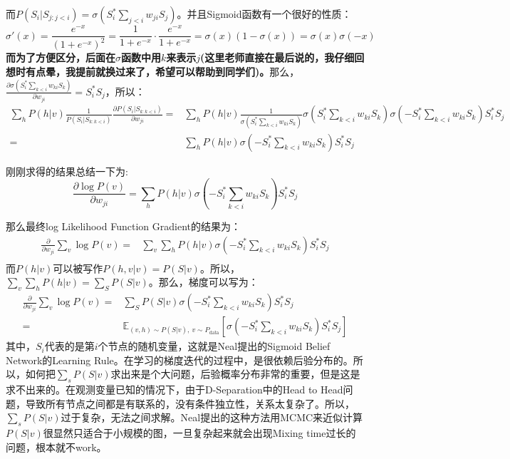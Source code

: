 \documentclass[a4paper]{article}
\begin{document}
而$P(S_i|S_{j:j<i}) = \sigma\left(S^\ast_i\sum_{j<i}w_{ji}S_j \right) $。并且Sigmoid函数有一个很好的性质：
\begin{equation}
    \sigma'(x) = \frac{e^{-x}}{(1+e^{-x})^2} = \frac{1}{1+e^{-x}} \cdot \frac{e^{-x}}{1+e^{-x}} = \sigma(x)(1-\sigma(x)) = \sigma(x) \sigma(-x)
\end{equation}
\textbf{而为了方便区分，后面在$\sigma$函数中用$k$来表示$j$(这里老师直接在最后说的，我仔细回想时有点晕，我提前就换过来了，希望可以帮助到同学们)。}那么，$\frac{\partial \sigma\left(S^\ast_i\sum_{k<i}w_{ki}S_k\right)}{\partial w_{ji}} = S^\ast_i S_j $，所以：
\begin{equation}
    \begin{split}
        \sum_h P(h|v) \frac{1}{P(S_i|S_{k:k<i})}\frac{ \partial P(S_i|S_{k:k<i})}{\partial w_{ji}} = & \sum_h P(h|v) \frac{1}{\sigma\left(S^\ast_i\sum_{k<i}w_{ki}S_k \right)}\sigma\left(S^\ast_i\sum_{k<i}w_{ki}S_k \right)\sigma\left(-S^\ast_i\sum_{k<i}w_{ki}S_k \right)S^\ast_i S_j \\
        = & \sum_h P(h|v) \sigma\left(-S^\ast_i\sum_{k<i}w_{ki}S_k \right)S^\ast_i S_j
    \end{split}
\end{equation}


刚刚求得的结果总结一下为:
\begin{equation}
     \frac{\partial \log P(v)}{\partial w_{ji}} = \sum_h P(h|v) \sigma\left(-S^\ast_i\sum_{k<i}w_{ki}S_k \right)S^\ast_i S_j
\end{equation}

那么最终log Likelihood Function Gradient的结果为：
{\color{red}
\begin{equation}
    \begin{split}
        \frac{\partial}{\partial w_{ji}} \sum_v \log P(v) = & \sum_v \sum_h P(h|v) \sigma\left(-S^\ast_i\sum_{k<i}w_{ki}S_k \right)S^\ast_i S_j \\
    \end{split}
\end{equation}
}
而$P(h|v)$可以被写作$P(h,v|v) = P(S|v)$。所以，$\sum_v \sum_h P(h|v) = \sum_S P(S|v)$。那么，梯度可以写为：
\begin{equation}
    \begin{split}
        \frac{\partial}{\partial w_{ji}} \sum_v \log P(v) = & \sum_S P(S|v) \sigma\left(-S^\ast_i\sum_{k<i}w_{ki}S_k \right)S^\ast_i S_j \\
        = & \mathbb{E}_{(v,h)\sim P(S|v),\ v\sim P_{\mathrm{data}}}\left[ \sigma\left(-S^\ast_i\sum_{k<i}w_{ki}S_k \right)S^\ast_i S_j \right]
    \end{split}
\end{equation}
其中，$S_i$代表的是第$i$个节点的随机变量，这就是Neal提出的Sigmoid Belief Network的Learning Rule。在学习的梯度迭代的过程中，是很依赖后验分布的。所以，如何把$\sum_s P(S|v)$求出来是个大问题，后验概率分布非常的重要，但是这是求不出来的。在观测变量已知的情况下，由于D-Separation中的Head to Head问题，导致所有节点之间都是有联系的，没有条件独立性，关系太复杂了。所以，$\sum_s P(S|v)$过于复杂，无法之间求解。Neal提出的这种方法用MCMC来近似计算$P(S|v)$很显然只适合于小规模的图，一旦复杂起来就会出现Mixing time过长的问题，根本就不work。
\end{document}
